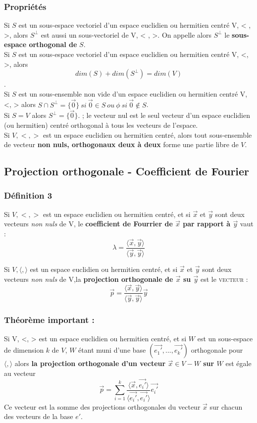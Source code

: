 \documentclass[12pt, a4paper]{article}
\begin{document}
\subsubsection*{Propriétés}
Si $S$ est un sous-espace vectoriel d'un espace euclidien ou hermitien centré V, < , >, alors $S^{\perp}$ est aussi un sous-vectoriel de V, < , >. On appelle alors $S^{\perp}$ le \textbf{sous-espace orthogonal de} $S$.\\

Si $S$ est un sous-espace vectoriel d'un espace euclidien ou hermitien centré V, <, >, alors 
$$dim(S) + dim(S^\perp) = dim(V)$$.\\

Si $S$ est un sous-ensemble non vide d'un espace euclidien ou hermitien centré V, <, > alors $S \cap S^\perp = \{\vec{0}\}\ si\ \vec{0} \in S\ ou\ \phi\ si\ \vec{0} \notin S$.\\

Si $S = V$ alors $S^\perp = \{\vec{0}\}$. ; le vecteur nul est le seul vecteur d'un espace euclidien (ou hermitien) centré orthogonal à tous les vecteurs de l'espace.\\

Si $V, <, >$ est un espace euclidien ou hermitien centré, alors tout sous-ensemble de vecteur \textbf{non nuls, orthogonaux deux à deux} forme une partie libre de $V$.

\subsection{Projection orthogonale - Coefficient de Fourier}
\subsubsection*{Définition 3}
Si $V, < , >$ est un espace euclidien ou hermitien centré, et si $\vec{x}$ et $\vec{y}$ sont deux vecteurs \textit{non nuls} de V, le \textbf{coefficient de Fourrier de $\vec{x}$ par rapport à $\vec{y}$} vaut : 
$$\lambda = \frac{\langle\vec{x}, \vec{y}\rangle}{\langle\vec{y}, \vec{y}\rangle}$$

Si $V, \langle , \rangle$ est un espace euclidien ou hermitien centré, et si $\vec{x}$ et $\vec{y}$ sont deux vecteurs \textit{non nuls} de V,la \textbf{projection orthogonale de $\vec{x}$ su $\vec{y}$} est le \textsc{vecteur} :
$$\vec{p} = \frac{\langle\vec{x}, \vec{y}\rangle}{\langle\vec{y}, \vec{y}\rangle}\vec{y}$$

\subsubsection{Théorème important :}
Si V, <, > est un espace euclidien ou hermitien centré, et si $W$ est un sous-espace de dimension $k$ de $V$, $W$ étant muni d'une base $(\vec{e_1'}, ..., \vec{e_k'})$ orthogonale pour $\langle , \rangle$ alors \textbf{la projection orthogonale d'un vecteur $\vec{x} \in V - W$ sur $W$} est égale au vecteur 
$$\vec{p} = \sum_{i=1}^k \frac{\langle\vec{x}, \vec{e_i'}\rangle}{\langle \vec{e_i'}, \vec{e_i'}\rangle}\vec{e_i'}$$
Ce vecteur est la somme des projections orthogonales du vecteur $\vec{x}$ sur chacun des vecteurs de la base $e'$.\\
\end{document}
